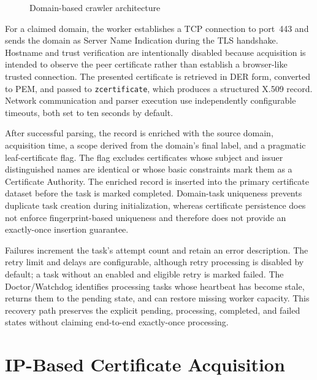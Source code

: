 \begin{figure}[H]
  \caption{Domain-based crawler architecture}
  \label{fig:domain-crawler-flow}
\end{figure}

For a claimed domain, the worker establishes a TCP connection to port~443 and
sends the domain as Server Name Indication during the TLS handshake. Hostname
and trust verification are intentionally disabled because acquisition is
intended to observe the peer certificate rather than establish a browser-like
trusted connection. The presented certificate is retrieved in DER form,
converted to PEM, and passed to \texttt{zcertificate}, which produces a
structured X.509 record. Network communication and parser execution use
independently configurable timeouts, both set to ten seconds by default.

After successful parsing, the record is enriched with the source domain,
acquisition time, a scope derived from the domain's final label, and a
pragmatic leaf-certificate flag. The flag excludes certificates whose subject
and issuer distinguished names are identical or whose basic constraints mark
them as a Certificate Authority. The enriched record is inserted into the
primary certificate dataset before the task is marked completed. Domain-task
uniqueness prevents duplicate task creation during initialization, whereas
certificate persistence does not enforce fingerprint-based uniqueness and
therefore does not provide an exactly-once insertion guarantee.

Failures increment the task's attempt count and retain an error description.
The retry limit and delays are configurable, although retry processing is
disabled by default; a task without an enabled and eligible retry is marked
failed. The Doctor/Watchdog identifies processing tasks whose heartbeat has
become stale, returns them to the pending state, and can restore missing worker
capacity. This recovery path preserves the explicit pending, processing,
completed, and failed states without claiming end-to-end exactly-once
processing.

\section{IP-Based Certificate Acquisition}
\label{sec:ip-crawler}


